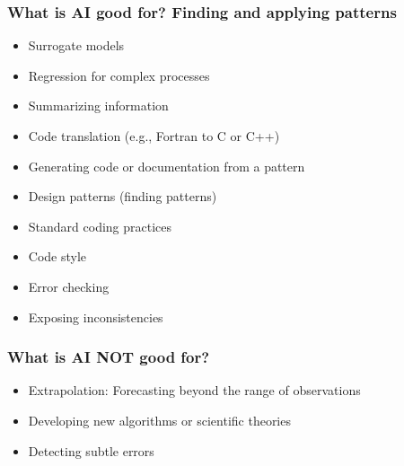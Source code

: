 \documentclass[aspectratio=169,hyperref=colorlinks]{beamer}
\begin{document}
\begin{frame}[t]
  \frametitle{What is AI good for? Finding and applying patterns}
  \summary{}

  \begin{itemize}
    \begin{itemize}
    \item Surrogate models
    \item Regression for complex processes
    \item Summarizing information
    \end{itemize}\pause
    \begin{itemize}
    \item Code translation (e.g., Fortran to C or C++)
    \item Generating code or documentation from a pattern
    \end{itemize}\pause
    \begin{itemize}
    \item Design patterns (finding patterns)
    \item Standard coding practices
    \end{itemize}\pause
    \begin{itemize}
    \item Code style
    \item Error checking
    \item Exposing inconsistencies
    \end{itemize}
  \end{itemize}
\end{frame}


\begin{frame}
  \frametitle{What is AI NOT good for?}
  \summary{}

  \begin{itemize}
    \item Extrapolation: Forecasting beyond the range of observations
    \item Developing new algorithms or scientific theories
    \item Detecting subtle errors
  \end{itemize}
  
\end{frame}
\end{document}
